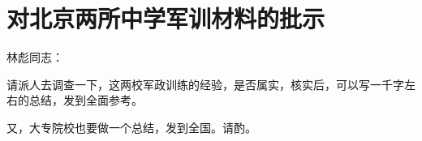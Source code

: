 \section[对北京两所中学军训材料的批示（一九六七年二月）]{对北京两所中学军训材料的批示}


\noindent 林彪同志：

请派人去调查一下，这两校军政训练的经验，是否属实，核实后，可以写一千字左右的总结，发到全面参考。

又，大专院校也要做一个总结，发到全国。请酌。

